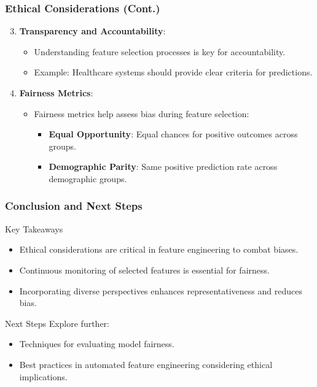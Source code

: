 \documentclass[aspectratio=169]{beamer}
\begin{document}
\begin{frame}[fragile]
    \frametitle{Ethical Considerations (Cont.)}
    \begin{enumerate}
        \setcounter{enumi}{2} %
        \item \textbf{Transparency and Accountability}:
            \begin{itemize}
                \item Understanding feature selection processes is key for accountability.
                \item Example: Healthcare systems should provide clear criteria for predictions.
            \end{itemize}
        \item \textbf{Fairness Metrics}:
            \begin{itemize}
                \item Fairness metrics help assess bias during feature selection:
                \begin{itemize}
                    \item \textbf{Equal Opportunity}: Equal chances for positive outcomes across groups.
                    \item \textbf{Demographic Parity}: Same positive prediction rate across demographic groups.
                \end{itemize}
            \end{itemize}
    \end{enumerate}
\end{frame}

\begin{frame}[fragile]
    \frametitle{Conclusion and Next Steps}
    \begin{block}{Key Takeaways}
        \begin{itemize}
            \item Ethical considerations are critical in feature engineering to combat biases.
            \item Continuous monitoring of selected features is essential for fairness.
            \item Incorporating diverse perspectives enhances representativeness and reduces bias.
        \end{itemize}
    \end{block}
    \begin{block}{Next Steps}
        Explore further:
        \begin{itemize}
            \item Techniques for evaluating model fairness.
            \item Best practices in automated feature engineering considering ethical implications.
        \end{itemize}
    \end{block}
\end{frame}
\end{document}
